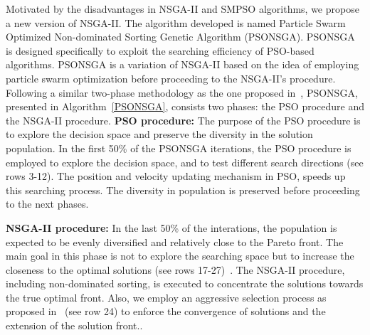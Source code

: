 \documentclass[10pt,journal,compsoc]{IEEEtran}
\begin{document}
Motivated by the disadvantages in NSGA-II and SMPSO algorithms, we propose a new version of NSGA-II. The algorithm developed is named Particle Swarm Optimized Non-dominated Sorting Genetic Algorithm (PSONSGA). PSONSGA is designed specifically to exploit the searching efficiency of PSO-based algorithms. PSONSGA is a variation of NSGA-II based on the idea of employing particle swarm optimization before proceeding to the NSGA-II's procedure. Following a similar two-phase methodology as the one proposed in~\cite{magnier2008multiobjective,onut2008two,sabri2000multi}, PSONSGA, presented in Algorithm~\ref{PSONSGA}, consists two phases: the PSO procedure and the NSGA-II procedure. %
\noindent\textbf{PSO procedure:}
The purpose of the PSO procedure is to explore the decision space and preserve the diversity in the solution population. In the first 50\% of the PSONSGA iterations, the PSO procedure is employed to explore the decision space, and to test different search directions (see rows 3-12). The position and velocity updating mechanism in PSO, speeds up this searching process. The diversity in population is preserved before proceeding to the next phases. %

\noindent\textbf{NSGA-II procedure:}
In the last 50\% of the interations, the population is expected to be evenly diversified and relatively close to the Pareto front. The main goal in this phase is not to explore the searching space but to increase the closeness to the optimal solutions (see rows 17-27)~\cite{concordia}. The NSGA-II procedure, including non-dominated sorting, is executed to concentrate the solutions towards the true optimal front. Also, we employ an aggressive selection process as proposed in~\cite{concordia} (see row 24) to enforce the convergence of solutions and the extension of the solution front.. %
\end{document}
